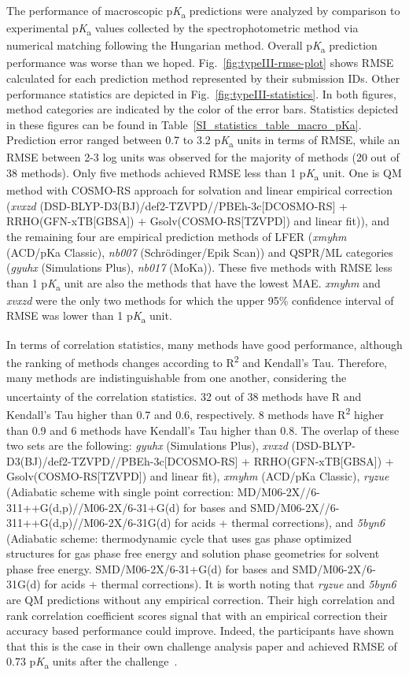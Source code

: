 \documentclass[9pt,lineno,final]{elife}
\newcommand{\pKa}{p\textit{K}\textsubscript{a}}
\begin{document}
The performance of macroscopic \pKa{} predictions were analyzed by comparison to experimental \pKa{} values collected by the spectrophotometric method via numerical matching following the Hungarian method.  
Overall \pKa{} prediction performance was worse than we hoped. 
Fig.~\ref{fig:typeIII-rmse-plot} shows RMSE calculated for each prediction method represented by their submission IDs. 
Other performance statistics are depicted in Fig.~\ref{fig:typeIII-statistics}.
In both figures, method categories are indicated by the color of the error bars.  Statistics depicted in these figures can be found in Table~\ref{SI_statistics_table_macro_pKa}.
Prediction error ranged between 0.7 to 3.2 \pKa{} units in terms of RMSE, while an RMSE between 2-3 log units was observed for the majority of methods (20 out of 38 methods). 
Only five methods achieved RMSE less than 1 \pKa{} unit. 
One is QM method with COSMO-RS approach for solvation and linear empirical correction (\textit{xvxzd} (DSD-BLYP-D3(BJ)/def2-TZVPD//PBEh-3c[DCOSMO-RS] + RRHO(GFN-xTB[GBSA]) + Gsolv(COSMO-RS[TZVPD]) and linear fit)), and the remaining four are empirical prediction methods of LFER (\textit{xmyhm} (ACD/pKa Classic), \textit{nb007} (Schr\"{o}dinger/Epik Scan)) and QSPR/ML categories (\textit{gyuhx} (Simulations Plus), \textit{nb017} (MoKa)). 
These five methods with RMSE less than 1 \pKa{} unit are also the methods that have the lowest MAE.
\textit{xmyhm} and \textit{xvxzd} were the only two methods for which the upper 95\% confidence interval of RMSE was lower than 1 \pKa{} unit. 

In terms of correlation statistics, many methods have good performance, although the ranking of methods changes according to R\textsuperscript{2} and Kendall's Tau. 
Therefore, many methods are indistinguishable from one another, considering the uncertainty of the correlation statistics. 
32 out of 38 methods have R\textsuperscript{} and Kendall's Tau higher than 0.7 and 0.6, respectively.
8 methods have R\textsuperscript{2} higher than 0.9 and 6 methods have Kendall's Tau higher than 0.8.
The overlap of these two sets are the following:
\textit{gyuhx} (Simulations Plus), \textit{xvxzd} (DSD-BLYP-D3(BJ)/def2-TZVPD//PBEh-3c[DCOSMO-RS] + RRHO(GFN-xTB[GBSA]) + Gsolv(COSMO-RS[TZVPD]) and linear fit), \textit{xmyhm} (ACD/pKa Classic), \textit{ryzue} (Adiabatic scheme with single point correction: MD/M06-2X//6-311++G(d,p)//M06-2X/6-31+G(d) for bases and SMD/M06-2X//6-311++G(d,p)//M06-2X/6-31G(d) for acids + thermal corrections), and \textit{5byn6} 
(Adiabatic scheme: thermodynamic cycle that uses gas phase optimized structures for gas phase free energy and solution phase geometries for solvent phase free energy. 
SMD/M06-2X/6-31+G(d) for bases and SMD/M06-2X/6-31G(d) for acids + thermal corrections).
It is worth noting that \textit{ryzue} and \textit{5byn6} are QM predictions without any empirical correction. Their high correlation and rank correlation coefficient scores signal that with an empirical correction their accuracy based performance could improve. 
Indeed, the participants have shown that this is the case in their own challenge analysis paper and achieved RMSE of 0.73 \pKa{} units after the challenge~\citep{Zeng:2018:J.Comput.AidedMol.Des.}. 
\end{document}
